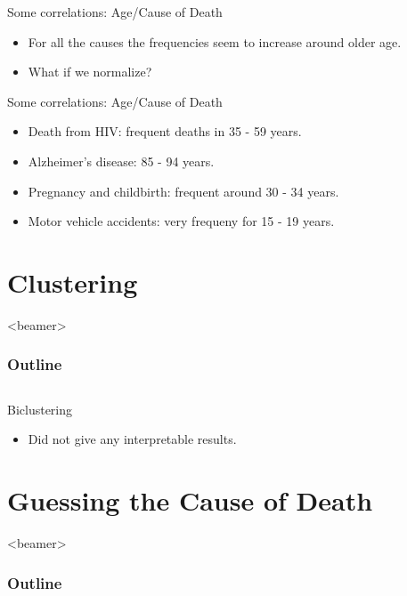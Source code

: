 \documentclass[xcolor=table]{beamer}
\begin{document}
  	 \begin{frame}{Some correlations: Age/Cause of Death}
     \begin{itemize}
			\item For all the causes the frequencies seem to increase around older age. 
			\item What if we normalize?
		\end{itemize}
     	\begin{center}
		 \end{center}
     \end{frame}
  	
  	\begin{frame}{Some correlations: Age/Cause of Death}
     \begin{itemize}
			\item Death from HIV:  frequent deaths in 35 - 59 years.
			\item Alzheimer's disease: 85 - 94 years.
			\item Pregnancy and childbirth: frequent around 30 - 34 years.
			\item Motor vehicle accidents: very frequeny for 15 - 19 years.

		\end{itemize}
     	\begin{center}
		 \end{center}
     \end{frame}
  	
\section{Clustering}
	\begin{frame}<beamer>
     \frametitle{Outline}
     \tableofcontents[currentsection]
    \end{frame}
    
  \subsection{}
  	\begin{frame}{Biclustering}
     \begin{itemize}
		\item Did not give any interpretable results.
	 \end{itemize}
    \end{frame}

\section{Guessing the Cause of Death}
     \begin{frame}<beamer>
     \frametitle{Outline}
     \tableofcontents[currentsection]
     \end{frame}
     
\end{document}
